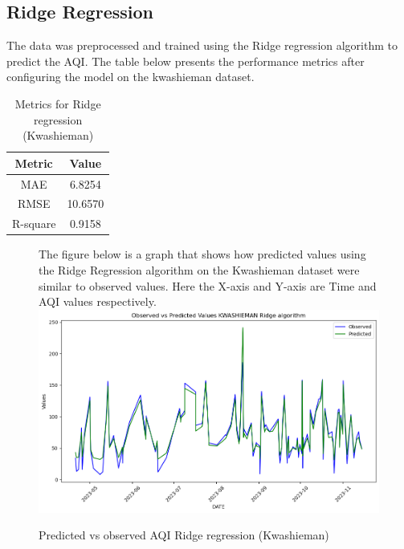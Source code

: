 \documentclass{book}
\numberwithin{equation}{section}
\numberwithin{figure}{section}
\begin{document}
\subsection{Ridge Regression}
The data was preprocessed and trained using the Ridge regression algorithm to predict the AQI. The table below presents the performance metrics after configuring the model on the kwashieman dataset.\\
\begin{table}[H]
    \centering
    \begin{tabular}{|c|c|}
        \hline
        \textbf{Metric} & \textbf{Value} \\
        \hline
        MAE & 6.8254 \\
        \hline
        RMSE & 10.6570\\
        \hline
        R-square & 0.9158 \\
        \hline
    \end{tabular}
    \caption{Metrics for Ridge regression (Kwashieman)}
    \label{tab: Ridge metrics(Kwashieman)}
\end{table}
\begin{figure}[H]
 \begin{minipage}{\linewidth}
        The figure below is a graph that shows how predicted values using the Ridge Regression algorithm on the Kwashieman dataset were similar to observed values. Here the X-axis and Y-axis are Time and AQI values respectively.
        \vspace{0.5em} 
        \includegraphics[width=\linewidth]{kwashieman ridge.png}
       
        \caption{ Predicted vs observed AQI Ridge regression (Kwashieman)}
        \label{fig: Ridge predicted vs observed AQI(Kwashieman)}
    \end{minipage}
\end{figure}
\end{document}
